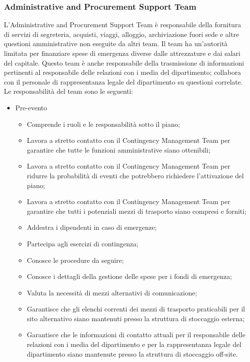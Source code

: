 \documentclass[12pt, a4paper, titlepage]{report}
\begin{document}
			\subsubsection{Administrative and Procurement Support Team}
			L'Administrative and Procurement Support Team è responsabile della fornitura di servizi di segreteria, acquisti, viaggi, alloggio, archiviazione fuori sede e altre questioni amministrative non eseguite da altri team. Il team ha un'autorità limitata per finanziare spese di emergenza diverse dalle attrezzature e dai salari del capitale. Questo team è anche responsabile della trasmissione di informazioni pertinenti al responsabile delle relazioni con i media del dipartimento; collabora con il personale di rappresentanza legale del dipartimento su questioni correlate. Le responsabilità del team sono le seguenti:
			\begin{itemize}
				\item Pre-evento
				\begin{itemize}
					\item Comprende i ruoli e le responsabilità sotto il piano;
					\item Lavora a stretto contatto con il Contingency Management Team per garantire che tutte le funzioni amministrative siano ottenibili;
					\item Lavora a stretto contatto con il Contingency Management Team per ridurre la probabilità di eventi che potrebbero richiedere l'attivazione del piano;
					\item Lavora a stretto contatto con il Contingency Management Team per garantire che tutti i potenziali mezzi di trasporto siano compresi e forniti;
					\item Addestra i dipendenti in caso di emergenze;
					\item Partecipa agli esercizi di contingenza;
					\item Conosce le procedure da seguire;
					\item Conosce i dettagli della gestione delle spese per i fondi di emergenza;
					\item Valuta la necessità di mezzi alternativi di comunicazione;
					\item Garantisce che gli elenchi correnti dei mezzi di trasporto praticabili per il sito alternativo siano mantenuti presso la struttura di stoccaggio esterna;
					\item Garantisce che le informazioni di contatto attuali per il responsabile delle relazioni con i media del dipartimento e per la rappresentanza legale del dipartimento siano mantenute presso la struttura di stoccaggio off-site.

\end{itemize}
\end{itemize}
\end{document}
